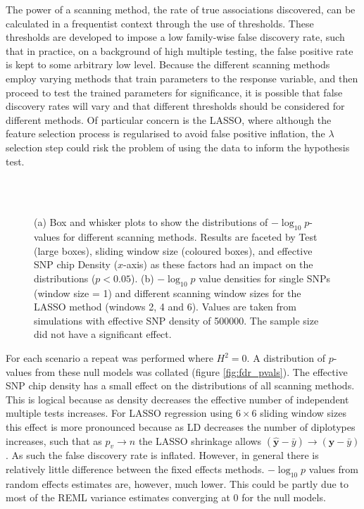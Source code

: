 The power of a scanning method, the rate of true associations discovered, can be calculated in a frequentist context through the use of thresholds. These thresholds are developed to impose a low family-wise false discovery rate, such that in practice, on a background of high multiple testing, the false positive rate is kept to some arbitrary low level. Because the different scanning methods employ varying methods that train parameters to the response variable, and then proceed to test the trained parameters for significance, it is possible that false discovery rates will vary and that different thresholds should be considered for different methods. Of particular concern is the LASSO, where although the feature selection process is regularised to avoid false positive inflation, the $\lambda$ selection step could risk the problem of using the data to inform the hypothesis test.

\begin{figure}
\begin{center}
\begin{center}
 \\
 \\
\caption[False discovery rates for supervised methods]{(a) Box and whisker plots to show the distributions of $-\log_{10}p$-values for different scanning methods. Results are faceted by Test (large boxes), sliding window size (coloured boxes), and effective SNP chip Density ($x$-axis) as these factors had an impact on the distributions ($p < 0.05$). (b) $-\log_{10}p$ value densities for single SNPs (window size = 1) and different scanning window sizes for the LASSO method (windows 2, 4 and 6). Values are taken from simulations with effective SNP density of 500000. The sample size did not have a significant effect.}
\label{fig:fdr}
\end{center}
\end{center}
\end{figure}

For each scenario a repeat was performed where $H^{2} = 0$. A distribution of $p$-values from these null models was collated (figure \ref{fig:fdr_pvals}). The effective SNP chip density has a small effect on the distributions of all scanning methods. This is logical because as density decreases the effective number of independent multiple tests increases. For LASSO regression using $6 \times 6$ sliding window sizes this effect is more pronounced because as LD decreases the number of diplotypes increases, such that as $p_{v} \to n$ the LASSO shrinkage allows $(\mathbf{\hat{y}} - \bar{y}) \to (\mathbf{y} - \bar{y})$. As such the false discovery rate is inflated. However, in general there is relatively little difference between the fixed effects methods. $-\log_{10}p$ values from random effects estimates are, however, much lower. This could be partly due to most of the REML variance estimates converging at 0 for the null models.

